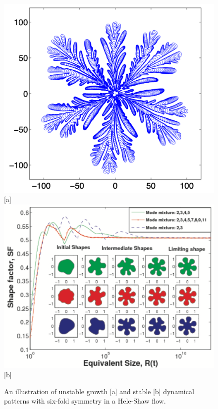 \begin{figure}
  \includegraphics[scale=0.2]{Unstable}[a]
  \includegraphics[scale=0.2]{Stable2}[b]
  \caption{An illustration of unstable growth [a] and stable [b] dynamical patterns with six-fold symmetry in a Hele-Shaw flow.}
  \label{figA}
  \end{figure}
  


